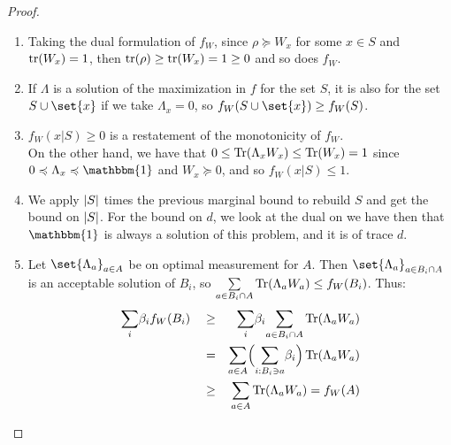 \documentclass{article}
\theoremstyle{definition}
\theoremstyle{remark}
\begin{document}
\begin{proof}
  \begin{enumerate}[label={(\arabic*)}]
  \item Taking the dual formulation of $f_W$, since $\rho \succcurlyeq W_x$ for some $x \in S$ and $\tr(W_x)=1$, then $\tr(\rho) \geq \tr(W_x) = 1 \geq 0$ and so does $f_W$.
  \item If $\Lambda$ is a solution of the maximization in $f$ for the set $S$, it is also for the set $S \cup \set{x}$ if we take $\Lambda_x = 0$, so $f_W(S \cup \set{x}) \geq f_W(S)$.
  \item $f_W(x|S) \geq 0$ is a restatement of the monotonicity of $f_W$.\\
    On the other hand, we have that $0 \leq \Tr(\Lambda_xW_x) \leq \Tr(W_x) = 1$ since $0 \preccurlyeq \Lambda_x \preccurlyeq \mathbbm{1}$ and $W_x \succcurlyeq 0$, and so $f_W(x|S) \leq 1$.
  \item We apply $\abs{S}$ times the previous marginal bound to rebuild $S$ and get the bound on $\abs{S}$. For the bound on $d$, we look at the dual on we have then that $\mathbbm{1}$ is always a solution of this problem, and it is of trace $d$.
  \item Let $\set{\Lambda_a}_{a \in A}$ be on optimal measurement for $A$. Then $\set{\Lambda_a}_{a \in B_i \cap A}$ is an acceptable solution of $B_i$, so $\underset{a \in B_i \cap A}{\sum} \Tr(\Lambda_a W_a) \leq f_W(B_i)$. Thus:
    \begin{equation}
      \begin{aligned}
        &\underset{i}{\sum}\beta_if_W(B_i) &&\geq& \underset{i}{\sum}\beta_i\underset{a \in B_i \cap A}{\sum} \Tr(\Lambda_a W_a) \\
        &&&=& \underset{a \in A}{\sum}\Big(\underset{i : B_i \ni a}{\sum} \beta_i\Big) \Tr(\Lambda_a W_a) \\
        &&&\geq& \underset{a \in A}{\sum} \Tr(\Lambda_a W_a) = f_W(A)
      \end{aligned}
    \end{equation}
  \end{enumerate}
\end{proof}
\end{document}
